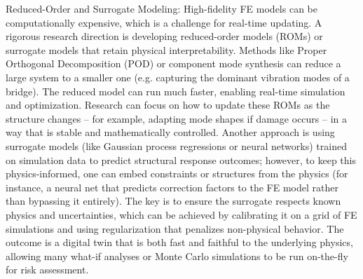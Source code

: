 Reduced-Order and Surrogate Modeling: High-fidelity FE models can be computationally expensive, which is a challenge for real-time updating. A rigorous research direction is developing reduced-order models (ROMs) or surrogate models that retain physical interpretability. Methods like Proper Orthogonal Decomposition (POD) or component mode synthesis can reduce a large system to a smaller one (e.g. capturing the dominant vibration modes of a bridge). The reduced model can run much faster, enabling real-time simulation and optimization. Research can focus on how to update these ROMs as the structure changes – for example, adapting mode shapes if damage occurs – in a way that is stable and mathematically controlled. Another approach is using surrogate models (like Gaussian process regressions or neural networks) trained on simulation data to predict structural response outcomes; however, to keep this physics-informed, one can embed constraints or structures from the physics (for instance, a neural net that predicts correction factors to the FE model rather than bypassing it entirely). The key is to ensure the surrogate respects known physics and uncertainties, which can be achieved by calibrating it on a grid of FE simulations and using regularization that penalizes non-physical behavior. The outcome is a digital twin that is both fast and faithful to the underlying physics, allowing many what-if analyses or Monte Carlo simulations to be run on-the-fly for risk assessment.

